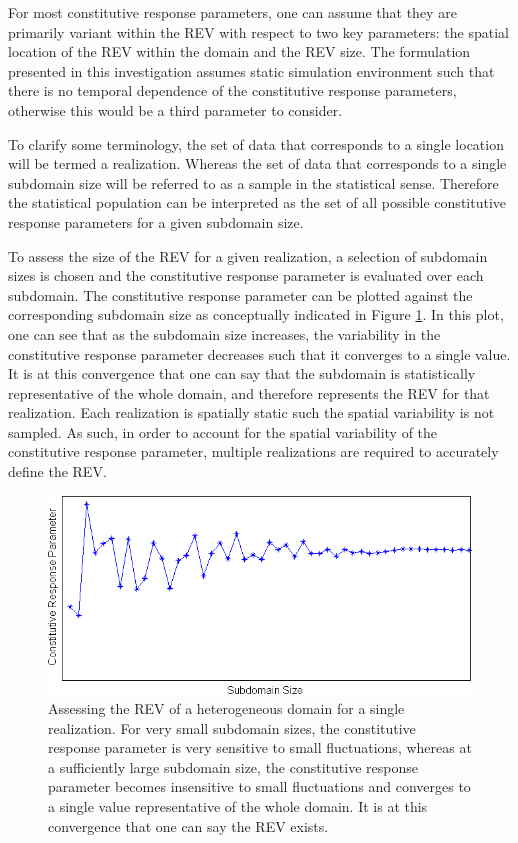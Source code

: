 For most constitutive response parameters, one can assume that they are primarily variant within the REV with respect to two key parameters: the spatial location of the REV within the domain and the REV size. The formulation presented in this investigation assumes static simulation environment such that there is no temporal dependence of the constitutive response parameters, otherwise this would be a third parameter to consider. 

To clarify some terminology, the set of data that corresponds to a single location will be termed a realization. Whereas the set of data that corresponds to a single subdomain size will be referred to as a sample in the statistical sense. Therefore the statistical population can be interpreted as the set of all possible constitutive response parameters for a given subdomain size. 

To assess the size of the REV for a given realization, a selection of subdomain sizes is chosen and the constitutive response parameter is evaluated over each subdomain. The constitutive response parameter can be plotted against the corresponding subdomain size as conceptually indicated in Figure \ref{fig:revConvergence}. In this plot, one can see that as the subdomain size increases, the variability in the constitutive response parameter decreases such that it converges to a single value. It is at this convergence that one can say that the subdomain is statistically representative of the whole domain, and therefore represents the REV for that realization. Each realization is spatially static such the spatial variability is not sampled. As such, in order to account for the spatial variability of the constitutive response parameter, multiple realizations are required to accurately define the REV.

\begin{figure}[!htb]
\begin{center}
\includegraphics[width=\textwidth]{figures/Chapter3/REVConvergence}
\caption{{\label{fig:revConvergence}Assessing the REV of a heterogeneous domain for a single realization. For very small subdomain sizes, the constitutive response parameter is very sensitive to small fluctuations, whereas at a sufficiently large subdomain size, the constitutive response parameter becomes insensitive to small fluctuations and converges to a single value representative of the whole domain. It is at this convergence that one can say the REV exists.%
}}
\end{center}
\end{figure}

